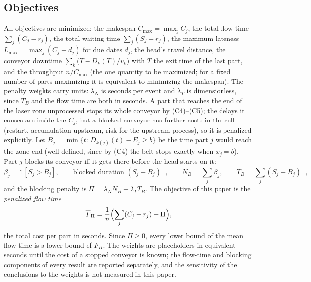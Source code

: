 \documentclass[11pt,a4paper]{article}
\theoremstyle{plain}
\theoremstyle{definition}
\theoremstyle{remark}
\newcommand{\Fpi}{\overline F_\Pi}
\begin{document}
\subsection{Objectives}
All objectives are minimized: the makespan $C_{\max}=\max_jC_j$, the total flow time
$\sum_j(C_j-r_j)$, the total waiting time $\sum_j(S_j-r_j)$, the maximum lateness
$L_{\max}=\max_j(C_j-d_j)$ for due dates $d_j$, the head's travel distance, the conveyor
downtime $\sum_k\bigl(T-D_k(T)/v_k\bigr)$ with $T$ the exit time of the last part, and the
throughput $n/C_{\max}$ (the one quantity to be maximized; for a fixed number of parts
maximizing it is equivalent to minimizing the makespan). The penalty weights carry units: $\lambda_N$ is seconds per event
and $\lambda_T$ is dimensionless, since $T_B$ and the flow time are both in seconds. A part that reaches the end of the laser zone unprocessed stops
its whole conveyor by (C4)--(C5); the delays it causes are inside the $C_j$, but a blocked
conveyor has further costs in the cell (restart, accumulation upstream, risk for the
upstream process), so it is penalized explicitly. Let $B_j=\min\{t:\ D_{k(j)}(t)-E_j\ge b\}$
be the time part $j$ would reach the zone end (well defined, since by (C4) the belt stops
exactly when $x_j=b$). Part $j$ blocks its conveyor iff it gets there before the head
starts on it:
\begin{equation}\label{eq:block}
\beta_j=\mathbb 1[S_j>B_j],\qquad\text{blocked duration }(S_j-B_j)^+,\qquad
N_B=\sum_j\beta_j,\qquad T_B=\sum_j(S_j-B_j)^+ ,
\end{equation}
and the blocking penalty is $\Pi=\lambda_N N_B+\lambda_T T_B$. The objective of this
paper is the \emph{penalized flow time}
\begin{equation}\label{eq:J}
\Fpi=\frac1n\Bigl(\sum_j(C_j-r_j)+\Pi\Bigr),
\end{equation}
the total cost per part in seconds. Since $\Pi\ge0$, every lower bound of the mean flow
time is a lower bound of $\Fpi$. The weights are placeholders in equivalent seconds until
the cost of a stopped conveyor is known; the flow-time and blocking components of every
result are reported separately, and the sensitivity of the conclusions to the weights
is not measured in this paper.
\end{document}
